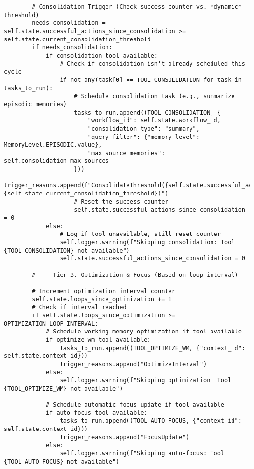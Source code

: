 \documentclass[12pt,a4paper]{article}
\begin{document}
\begin{pageablecode}
\begin{verbatim}
        # Consolidation Trigger (Check success counter vs. *dynamic* threshold)
        needs_consolidation = self.state.successful_actions_since_consolidation >= self.state.current_consolidation_threshold
        if needs_consolidation:
            if consolidation_tool_available:
                # Check if consolidation isn't already scheduled this cycle
                if not any(task[0] == TOOL_CONSOLIDATION for task in tasks_to_run):
                    # Schedule consolidation task (e.g., summarize episodic memories)
                    tasks_to_run.append((TOOL_CONSOLIDATION, {
                        "workflow_id": self.state.workflow_id,
                        "consolidation_type": "summary",
                        "query_filter": {"memory_level": MemoryLevel.EPISODIC.value},
                        "max_source_memories": self.consolidation_max_sources
                    }))
                    trigger_reasons.append(f"ConsolidateThreshold({self.state.successful_actions_since_consolidation:.1f}>={self.state.current_consolidation_threshold})")
                    # Reset the success counter
                    self.state.successful_actions_since_consolidation = 0
            else:
                # Log if tool unavailable, still reset counter
                self.logger.warning(f"Skipping consolidation: Tool {TOOL_CONSOLIDATION} not available")
                self.state.successful_actions_since_consolidation = 0

        # --- Tier 3: Optimization & Focus (Based on loop interval) ---
        # Increment optimization interval counter
        self.state.loops_since_optimization += 1
        # Check if interval reached
        if self.state.loops_since_optimization >= OPTIMIZATION_LOOP_INTERVAL:
            # Schedule working memory optimization if tool available
            if optimize_wm_tool_available:
                tasks_to_run.append((TOOL_OPTIMIZE_WM, {"context_id": self.state.context_id}))
                trigger_reasons.append("OptimizeInterval")
            else:
                self.logger.warning(f"Skipping optimization: Tool {TOOL_OPTIMIZE_WM} not available")

            # Schedule automatic focus update if tool available
            if auto_focus_tool_available:
                tasks_to_run.append((TOOL_AUTO_FOCUS, {"context_id": self.state.context_id}))
                trigger_reasons.append("FocusUpdate")
            else:
                self.logger.warning(f"Skipping auto-focus: Tool {TOOL_AUTO_FOCUS} not available")


\end{verbatim}
\end{pageablecode}
\end{document}
